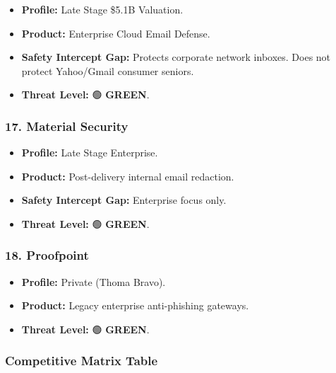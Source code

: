 \documentclass[
]{article}
\providecommand{\tightlist}{%
  \setlength{\itemsep}{0pt}\setlength{\parskip}{0pt}}
\begin{document}
\begin{itemize}
\tightlist
\item
  \textbf{Profile:} Late Stage \textbar{} \$5.1B Valuation.
\item
  \textbf{Product:} Enterprise Cloud Email Defense.
\item
  \textbf{Safety Intercept Gap:} Protects corporate network inboxes.
  Does not protect Yahoo/Gmail consumer seniors.
\item
  \textbf{Threat Level:} 🟢 \textbf{GREEN}.
\end{itemize}

\subsubsection{17. Material Security}\label{material-security}

\begin{itemize}
\tightlist
\item
  \textbf{Profile:} Late Stage Enterprise.
\item
  \textbf{Product:} Post-delivery internal email redaction.
\item
  \textbf{Safety Intercept Gap:} Enterprise focus only.
\item
  \textbf{Threat Level:} 🟢 \textbf{GREEN}.
\end{itemize}

\subsubsection{18. Proofpoint}\label{proofpoint}

\begin{itemize}
\tightlist
\item
  \textbf{Profile:} Private (Thoma Bravo).
\item
  \textbf{Product:} Legacy enterprise anti-phishing gateways.
\item
  \textbf{Threat Level:} 🟢 \textbf{GREEN}.
\end{itemize}

\subsubsection{Competitive Matrix Table}\label{competitive-matrix-table}
\end{document}
